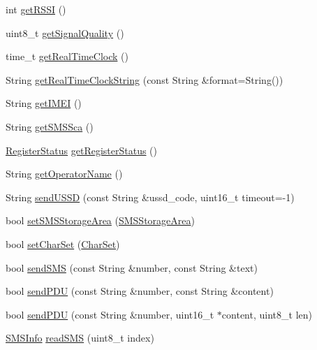 \begin{DoxyCompactItemize}
\item 
int \mbox{\hyperlink{class_a6lib_a07fc81b3217b490883ec402795839fad}{get\+R\+S\+SI}} ()
\item 
uint8\+\_\+t \mbox{\hyperlink{class_a6lib_a90a1e3733155181d56c02f7973066ddf}{get\+Signal\+Quality}} ()
\item 
time\+\_\+t \mbox{\hyperlink{class_a6lib_aaae53e03a783490c15898843f81498c4}{get\+Real\+Time\+Clock}} ()
\item 
String \mbox{\hyperlink{class_a6lib_a332dca9ec1dabb54b51535f2c5350aae}{get\+Real\+Time\+Clock\+String}} (const String \&format=String())
\item 
String \mbox{\hyperlink{class_a6lib_a365df3e93f910171da9d5914ae1997c2}{get\+I\+M\+EI}} ()
\item 
String \mbox{\hyperlink{class_a6lib_ae1b286d8db58b85e8295a4293ab450db}{get\+S\+M\+S\+Sca}} ()
\item 
\mbox{\hyperlink{_a6lib_8h_a0a43f46ad95cebb665a0d371219a6015}{Register\+Status}} \mbox{\hyperlink{class_a6lib_a7a8beb6c42199ea32f9a73f45f7b500e}{get\+Register\+Status}} ()
\item 
String \mbox{\hyperlink{class_a6lib_a22777c9190a6be69c64010d03b022b3c}{get\+Operator\+Name}} ()
\item 
String \mbox{\hyperlink{class_a6lib_a3b1d337ccece8b0a57881a05934dd250}{send\+U\+S\+SD}} (const String \&ussd\+\_\+code, uint16\+\_\+t timeout=-\/1)
\item 
bool \mbox{\hyperlink{class_a6lib_abd141d94b19ce4221c0aa692c34f9b42}{set\+S\+M\+S\+Storage\+Area}} (\mbox{\hyperlink{_a6lib_8h_a683c3425c199702a4b8b13f7f2518af5}{S\+M\+S\+Storage\+Area}})
\item 
bool \mbox{\hyperlink{class_a6lib_a190d29007bf7cec32f24eeca6dd212b0}{set\+Char\+Set}} (\mbox{\hyperlink{_a6lib_8h_a05ab29788588d54d1b515588e8eb14b0}{Char\+Set}})
\item 
bool \mbox{\hyperlink{class_a6lib_aaf7efdb36c3d8c419a0bf26d5220f91d}{send\+S\+MS}} (const String \&number, const String \&text)
\item 
bool \mbox{\hyperlink{class_a6lib_a0ce431632e4a5e4d26c2d95c83fe7ee5}{send\+P\+DU}} (const String \&number, const String \&content)
\item 
bool \mbox{\hyperlink{class_a6lib_ae7b4dfe629c48b1b36c1409bb4f4720e}{send\+P\+DU}} (const String \&number, uint16\+\_\+t $\ast$content, uint8\+\_\+t len)
\item 
\mbox{\hyperlink{class_s_m_s_info}{S\+M\+S\+Info}} \mbox{\hyperlink{class_a6lib_aad58cce8168f9554470f3afa854afb29}{read\+S\+MS}} (uint8\+\_\+t index)

\end{DoxyCompactItemize}
